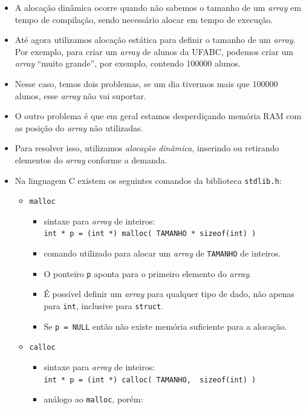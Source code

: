 \documentclass[12pt,a4paper]{article}
\providecommand{\tightlist}{%
      \setlength{\itemsep}{0pt}\setlength{\parskip}{0pt}}
\begin{document}
    \begin{itemize}
\item
  A alocação dinâmica ocorre quando não sabemos o tamanho de um
  \emph{array} em tempo de compilação, sendo necessário alocar em tempo
  de execução.
\item
  Até agora utilizamos alocação estática para definir o tamanho de um
  \emph{array}. Por exemplo, para criar um \emph{array} de alunos da
  UFABC, podemos criar um \emph{array} ``muito grande'', por exemplo,
  contendo 100000 alunos.
\item
  Nesse caso, temos dois problemas, se um dia tivermos mais que 100000
  alunos, esse \emph{array} não vai suportar.
\item
  O outro problema é que em geral estamos desperdiçando memória RAM com
  as posição do \emph{array} não utilizadas.
\item
  Para resolver isso, utilizamos \emph{alocação dinâmica}, inserindo ou
  retirando elementos do \emph{array} conforme a demanda.
\item
  Na linguagem C existem os seguintes comandos da biblioteca
  \texttt{stdlib.h}:

  \begin{itemize}
  \tightlist
  \item
    \texttt{malloc}

    \begin{itemize}
    \tightlist
    \item
      sintaxe para \emph{array} de inteiros:
      \texttt{int\ *\ p\ =\ (int\ *)\ malloc(\ TAMANHO\ *\ sizeof(int)\ )}
    \item
      comando utilizado para alocar um \emph{array} de \texttt{TAMANHO}
      de inteiros.
    \item
      O ponteiro \texttt{p} aponta para o primeiro elemento do
      \emph{array}.
    \item
      É possível definir um \emph{array} para qualquer tipo de dado, não
      apenas para \texttt{int}, inclusive para \texttt{struct}.
    \item
      Se \texttt{p\ =\ NULL} então não existe memória suficiente para a
      alocação.
    \end{itemize}
  \item
    \texttt{calloc}

    \begin{itemize}
    \tightlist
    \item
      sintaxe para \emph{array} de inteiros:
      \texttt{int\ *\ p\ =\ (int\ *)\ calloc(\ TAMANHO,\ \ sizeof(int)\ )}
    \item
      análogo ao \texttt{malloc}, porém:


\end{itemize}
\end{itemize}
\end{itemize}
\end{document}
